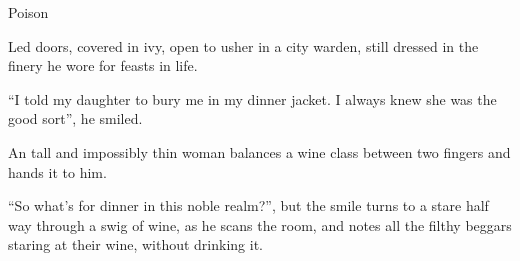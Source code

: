 \begin{multicols}{2}

\newcommand\guild[8][\textxswup]{
  \vspace{2em}
  \noindent
  \begin{minipage}{\linewidth}
  \subsection[The Temple of #3]{#1~#2~#1 \\ \& \\ The Temple of #3}
  \ifdefmacro{#2}{}{\index{#2}}
  \index{#3 (God)}
  \ifdefmacro{#7}{}{\index{#7}}
  \index{Gods}

  \begin{exampletext}
  \noindent
  #4
  \end{exampletext}
  \end{minipage}

  \noindent
  \begin{minipage}{\linewidth}
  \begin{description}
  \item[Domain:] #5

  \item[Defence:] #6

  \item[Watchers:] #7

  \item[Activities:] #8

  \end{description}
  \end{minipage}

  \subsubsection{#7}
}

  {Poison}%
  {
    Led doors, covered in ivy, open to usher in a city warden, still dressed in the finery he wore for feasts in life.

    ``I told my daughter to bury me in my dinner jacket.
    I always knew she was the good sort'', he smiled.

    An tall and impossibly thin woman balances a wine class between two fingers and hands it to him.

    ``So what's for dinner in this noble realm?'', but the smile turns to a stare half way through a swig of wine, as he scans the room, and notes all the filthy beggars staring at their wine, without drinking it.

}
\end{multicols}
